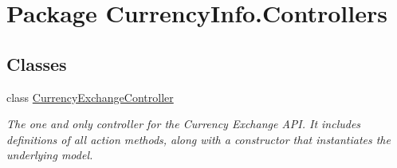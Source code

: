 \hypertarget{namespace_currency_info_1_1_controllers}{\section{Package Currency\-Info.\-Controllers}
\label{namespace_currency_info_1_1_controllers}
}
\subsection*{Classes}
\begin{DoxyCompactItemize}
\item 
class \hyperlink{class_currency_info_1_1_controllers_1_1_currency_exchange_controller}{Currency\-Exchange\-Controller}
\begin{DoxyCompactList}\small\item\em The one and only controller for the Currency Exchange A\-P\-I. It includes definitions of all action methods, along with a constructor that instantiates the underlying model. \end{DoxyCompactList}\end{DoxyCompactItemize}
